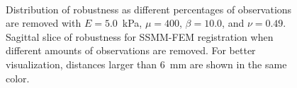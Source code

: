 \documentclass[journal]{IEEEtran}
\begin{document}
\begin{figure}[t]
	\centering
	\\
	\caption{Distribution of robustness as different percentages of observations are removed with $E=5.0$~kPa, $\mu=400$, $\beta=10.0$, and $\nu=0.49$. Sagittal slice of robustness for SSMM-FEM registration when different amounts of observations are removed. For better visualization, distances larger than 6~mm are shown in the same color.}\label{fig:Missing}
\end{figure}
\end{document}
